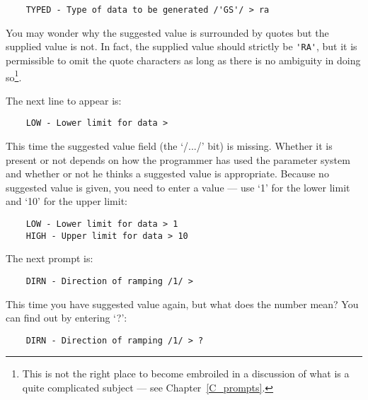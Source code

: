 \begin{small}
\begin{verbatim}
    TYPED - Type of data to be generated /'GS'/ > ra
\end{verbatim}
\end{small}

You may wonder why the suggested value is surrounded by quotes but the supplied
value is not.
In fact, the supplied value should strictly be \verb+'RA'+, but it is
permissible to omit the quote characters as long as there is no ambiguity in
doing so\footnote{This is not the right place to become embroiled in a 
discussion of what is a quite complicated subject --- see
Chapter~\ref{C_prompts}.}.

The next line to appear is:

\begin{small}
\begin{verbatim}
    LOW - Lower limit for data >
\end{verbatim}
\end{small}

This time the suggested value field (the `/.../' bit) is missing.
Whether it is present or not depends on how the programmer has used the
parameter system and whether or not he thinks a suggested value is appropriate.
Because no suggested value is given, you need to enter a value --- use
`1' for the lower limit and `10' for the upper limit:

\begin{small}
\begin{verbatim}
    LOW - Lower limit for data > 1
    HIGH - Upper limit for data > 10
\end{verbatim}
\end{small}

The next prompt is:

\begin{small}
\begin{verbatim}
    DIRN - Direction of ramping /1/ >
\end{verbatim}
\end{small}

This time you have suggested value again, but what does the number mean?
You can find out by entering `?':

\begin{small}
\begin{verbatim}
    DIRN - Direction of ramping /1/ > ?
\end{verbatim}
\end{small}

